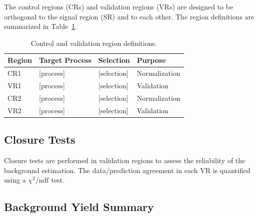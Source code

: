 
The control regions (CRs) and validation regions (VRs) are designed to be
orthogonal to the signal region (SR) and to each other. The region
definitions are summarized in Table~\ref{tab:region_definitions}.


\begin{table}[htbp]
  \centering
  \caption{Control and validation region definitions.}
  \label{tab:region_definitions}
  \begin{tabular}{llll}
    \toprule
    Region & Target Process & Selection & Purpose \\
    \midrule
    CR1 & [process] & [selection] & Normalization \\
    VR1 & [process] & [selection] & Validation \\
    CR2 & [process] & [selection] & Normalization \\
    VR2 & [process] & [selection] & Validation \\
    \bottomrule
  \end{tabular}
\end{table}

\subsection{Closure Tests}
\label{sec:background:closure}


Closure tests are performed in validation regions to assess the reliability
of the background estimation. The data/prediction agreement in each VR is
quantified using a $\chi^2/\text{ndf}$ test.

\subsection{Background Yield Summary}
\label{sec:background:yields}


